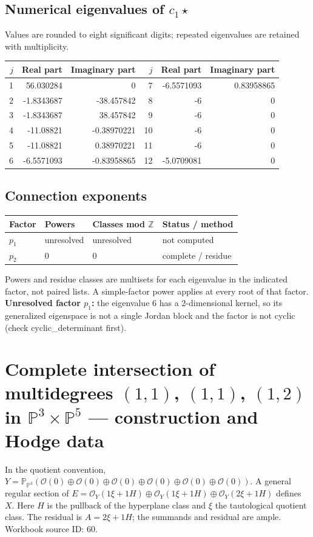 \documentclass[10pt,a4paper]{article}
\begin{document}
\subsection*{Numerical eigenvalues of $c_1\star$}
Values are rounded to eight significant digits; repeated eigenvalues are retained with multiplicity.
\begin{center}\small\begin{tabular}{rrr@{\qquad}rrr}\toprule $j$ & Real part & Imaginary part & $j$ & Real part & Imaginary part\\\midrule
1 & 56.030284 & 0 & 7 & -6.5571093 & 0.83958865\\
2 & -1.8343687 & -38.457842 & 8 & -6 & 0\\
3 & -1.8343687 & 38.457842 & 9 & -6 & 0\\
4 & -11.08821 & -0.38970221 & 10 & -6 & 0\\
5 & -11.08821 & 0.38970221 & 11 & -6 & 0\\
6 & -6.5571093 & -0.83958865 & 12 & -5.0709081 & 0\\
\bottomrule\end{tabular}\end{center}
\subsection*{Connection exponents}
\begin{center}\begin{tabular}{llll}\toprule Factor & Powers & Classes mod $\mathbb Z$ & Status / method\\\midrule
$p_{1}$ & unresolved & unresolved & not computed\\
$p_{2}$ & $0$ & $0$ & complete / residue\\
\bottomrule\end{tabular}\end{center}
Powers and residue classes are multisets for each eigenvalue in the indicated factor, not paired lists. A simple-factor power applies at every root of that factor.
\textbf{Unresolved factor $p_{1}$:} the eigenvalue 6 has a 2-dimensional kernel, so its generalized eigenspace is not a single Jordan block and the factor is not cyclic (check cyclic\_determinant first).
\clearpage\section*{Complete intersection of multidegrees $(1,1)$, $(1,1)$, $(1,2)$ in $\mathbb P^{3}\times \mathbb P^{5}$ --- construction and Hodge data}\label{entry:PB5-060}
In the quotient convention, $Y=\mathbb P_{\mathbb P^{3}}(\mathcal O(0)\oplus\mathcal O(0)\oplus\mathcal O(0)\oplus\mathcal O(0)\oplus\mathcal O(0)\oplus\mathcal O(0))$.
A general regular section of $E=\mathcal O_Y(1\xi+1H)\oplus\mathcal O_Y(1\xi+1H)\oplus\mathcal O_Y(2\xi+1H)$ defines $X$.
Here $H$ is the pullback of the hyperplane class and $\xi$ the tautological quotient class. The residual is $A=2\xi+1H$; the summands and residual are ample.
Workbook source ID: 60.
\end{document}
